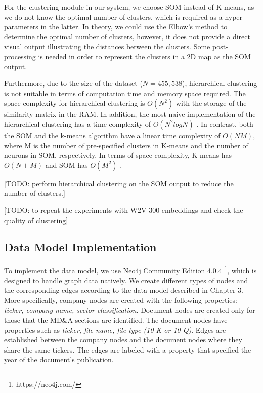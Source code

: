 For the clustering module in our system, we choose SOM instead of K-means, as we do not know the optimal number of clusters, which is required as a hyper-parameters in the latter. In theory, we could use the Elbow's method \cite{elbow2020} to determine the optimal number of clusters, however, it does not provide a direct visual output illustrating the distances between the clusters. Some post-processing is needed in order to represent the clusters in a 2D map as the SOM output. 

Furthermore, due to the size of the dataset ($N=455,538$), hierarchical clustering is not suitable in terms of computation time and memory space required. The space complexity for hierarchical clustering is $O(N^2)$ with the storage of the similarity matrix in the RAM. In addition, the most naive implementation of the hierarchical clustering has a time complexity of $O(N^2 log N)$ \cite{clustering1999}. In contrast, both the SOM and the k-means algorithm have a linear time complexity of $O(NM)$, where M is the number of pre-specified clusters in K-means and the number of neurons in SOM, respectively. In terms of space complexity, K-means has $O(N+M)$ \cite{clustering1999} and SOM has $O(M^2)$ \cite{complexity2017}.  

[TODO: perform hierarchical clustering on the SOM output to reduce the number of clusters.] 

[TODO: to repeat the experiments with W2V 300 embeddings and check the quality of clustering]


\subsection{Data Model Implementation}

To implement the data model, we use Neo4j Community Edition 4.0.4 \footnote {https://neo4j.com/}, which is designed to handle graph data natively. We create different types of nodes and the corresponding edges according to the data model described in Chapter 3. 
More specifically, company nodes are created with the following properties: \emph{ticker, company name, sector classification}. Document nodes are created only for those that the MD\&A sections are identified. The document nodes have properties such as \emph{ticker, file name, file type (10-K or 10-Q)}. Edges are established between the company nodes and the document nodes where they share the same tickers. The edges are labeled with a property that specified the year of the document's publication.

